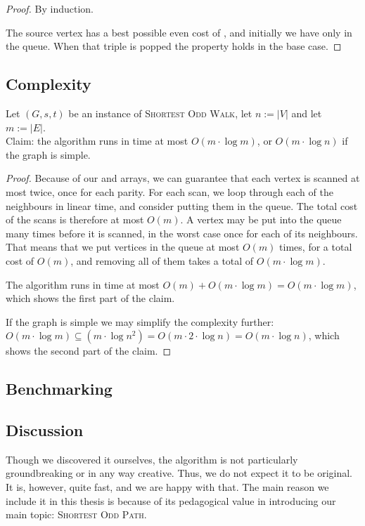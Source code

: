 \begin{proof}
By induction. 

The source vertex  has a best possible even cost of , and initially we have only  in the queue. When that triple is popped the property holds in the base case.


\end{proof}

\subsection{Complexity}
Let $(G,s,t)$ be an instance of \textsc{Shortest Odd Walk}, let $n := |V|$ and let $m := |E|$.\\
Claim: the algorithm runs in time at most $O(m \cdot \log m)$, or $O(m \cdot \log n)$ if the graph is simple.
\begin{proof}
    Because of our  and  arrays, we can guarantee that each vertex is scanned at most twice, once for each parity. For each scan, we loop through each of the neighbours in linear time, and consider putting them in the queue. The total cost of the scans is therefore at most $O(m)$. A vertex may be put into the queue many times before it is scanned, in the worst case once for each of its neighbours. That means that we put vertices in the queue at most $O(m)$ times, for a total cost of $O(m)$, and removing all of them takes a total of $O(m \cdot \log m)$. 
    
    The algorithm runs in time at most $O(m) + O(m \cdot \log m) = O(m \cdot \log m)$, which shows the first part of the claim.
    
    If the graph is simple we may simplify the complexity further: $O(m \cdot \log m) \subseteq (m \cdot \log n^2) = O(m \cdot 2 \cdot \log n) = O(m \cdot \log n)$, which shows the second part of the claim.
\end{proof}

\subsection{Benchmarking}


\subsection{Discussion}
Though we discovered it ourselves, the algorithm is not particularly groundbreaking or in any way creative. Thus, we do not expect it to be original. It is, however, quite fast, and we are happy with that. The main reason we include it in this thesis is because of its pedagogical value in introducing our main topic: \textsc{Shortest Odd Path}. 